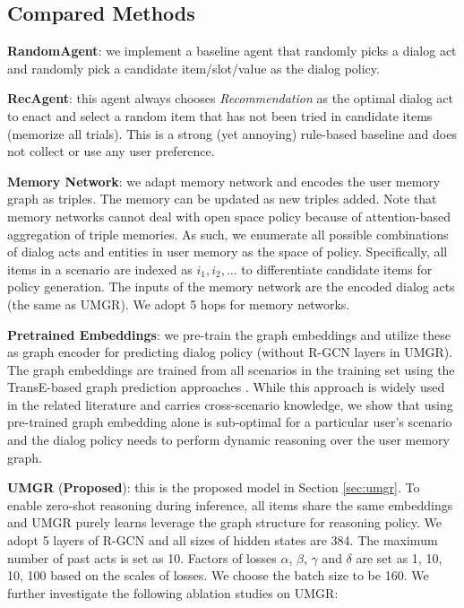 \documentclass[11pt,a4paper]{article}
\begin{document}
\subsection{Compared Methods}
\noindent \textbf{RandomAgent}: we implement a baseline agent that randomly picks a dialog act and randomly pick a candidate item/slot/value as the dialog policy.

\noindent \textbf{RecAgent}: this agent always chooses \textit{Recommendation} as the optimal dialog act to enact and select a random item that has not been tried in candidate items (memorize all trials). This is a strong (yet annoying) rule-based baseline and does not collect or use any user preference.

\noindent \textbf{Memory Network}\cite{sukhbaatar2015end,bordes2016learning}: we adapt memory network and encodes the user memory graph as triples. The memory can be updated as new triples added. Note that memory networks cannot deal with open space policy because of attention-based aggregation of triple memories. As such, we enumerate all possible combinations of dialog acts and entities in user memory as the space of policy. Specifically, all items in a scenario are indexed as $i_1, i_2, \dots$ to differentiate candidate items for policy generation. The inputs of the memory network are the encoded dialog acts (the same as UMGR). We adopt 5 hops for memory networks.

\noindent \textbf{Pretrained Embeddings}: 
we pre-train the graph embeddings and utilize these as graph encoder for predicting dialog policy (without  R-GCN layers in UMGR).
The graph embeddings are trained from all scenarios in the training set using the TransE-based graph prediction approaches \cite{Nickel+15}.
While this approach is widely used in the related literature and carries cross-scenario knowledge, we show that using pre-trained graph embedding alone is sub-optimal for a particular user's scenario and the dialog policy needs to perform dynamic reasoning over the user memory graph.

\noindent \textbf{UMGR} (\textbf{Proposed}): this is the proposed model in Section \ref{sec:umgr}. 
To enable zero-shot reasoning during inference, all items share the same embeddings and UMGR purely learns leverage the graph structure for reasoning policy.
We adopt 5 layers of R-GCN and all sizes of hidden states are 384. The maximum number of past acts is set as 10.
Factors of losses $\alpha$, $\beta$, $\gamma$ and $\delta$ are set as 1, 10, 10, 100 based on the scales of losses. 
We choose the batch size to be 160.
We further investigate the following ablation studies on UMGR:
\end{document}
